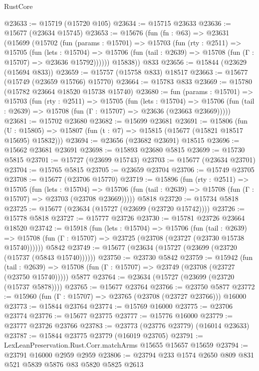 \begin{lexlean}{RustCore}
\begin{coremodule}
@23633 := @15719 (@15720 @105)
@23634 := @15715 @23633
@23636 := @15677 (@23634 @15745)
@23653 := @15676
    (fun (fn : @63) =>
    @23631
      (@15699
        (@15702
          (fun (params : @15701) =>
          @15703
            (fun (rty : @2511) =>
            @15705
              (fun (lets : @15704) =>
              @15706 (fun (tail : @2639) => @15708 (fun (Γ : @15707) => @23636 @15792))))))
        @15838))
    @833
@23656 := @15844 (@23629 (@15694 @833))
@23659 := @15757 (@15758 @833) @18517
@23663 := @15677 (@15749 (@23659 @15766) @15770)
@23664 := @15783 @833
@23669 := @15780 (@15782 @23664 @18520 @15738 @15740)
@23680 := fun (params : @15701) =>
  @15703
    (fun (rty : @2511) =>
    @15705
      (fun (lets : @15704) =>
      @15706 (fun (tail : @2639) => @15708 (fun (Γ : @15707) => @23636 (@23663 @23669)))))
@23681 := @15702 @23680
@23682 := @15699 @23681
@23691 := @15806
    (fun (U : @15805) => @15807 (fun (t : @7) => @15815 (@15677 (@15821 @18517 @15695) @15832)))
@23694 := @23656 (@23682 @23691) @18515
@23696 := @15662 @23681 @23691
@23698 := @15893 @23680 @5815
@23699 := @15730 @5815
@23701 := @15727 (@23699 @15743)
@23703 := @15677 (@23634 @23701)
@23704 := @15765 @5815
@23705 := @23659 @23704
@23706 := @15749 @23705
@23708 := @15677 (@23706 @15770)
@23719 := @15896
    (fun (rty : @2511) =>
    @15705
      (fun (lets : @15704) =>
      @15706 (fun (tail : @2639) => @15708 (fun (Γ : @15707) => @23703 (@23708 @23669)))))
    @5818
@23720 := @15734 @5818
@23725 := @15677 (@23634 (@15727 (@23699 (@23720 @15742))))
@23726 := @15778 @5818
@23727 := @15777 @23726
@23730 := @15781 @23726 @23664 @18520
@23742 := @15918
    (fun (lets : @15704) =>
    @15706
      (fun (tail : @2639) =>
      @15708 (fun (Γ : @15707) => @23725 (@23708 (@23727 (@23730 @15738 @15740))))))
    @5842
@23749 := @15677 (@23634 (@15727 (@23699 (@23720 (@15737 (@5843 @15740))))))
@23750 := @23730 @5842
@23759 := @15942
    (fun (tail : @2639) => @15708 (fun (Γ : @15707) => @23749 (@23708 (@23727 (@23750 @15740)))))
    @5877
@23764 := @23634 (@15727 (@23699 (@23720 (@15737 @5878))))
@23765 := @15677 @23764
@23766 := @23750 @5877
@23772 := @15960 (fun (Γ : @15707) => @23765 (@23708 (@23727 @23766))) @16000
@23773 := @15844 @23764
@23774 := @15769 @16000
@23775 := @23706 @23774
@23776 := @15677 @23775
@23777 := @15776 @16000
@23779 := @23777 @23726 @23766
@23783 := @23773 (@23776 @23779) (@16014 @23633)
@23787 := @15844 @23775 @23779 (@16019 @23705)
@23791 := LexLeanPreservation.Rust.Corr.matchArms @15655 @15657 @15659
@23794 := @23791 @16000 @2959 @2959
@23806 := @23794 @233 @1574 @2650 @809 @831 @521 @5839 @5876 @83 @5820 @5825 @2613

\end{coremodule}
\end{lexlean}
